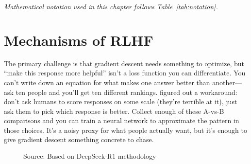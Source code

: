 \documentclass[12pt,a4paper]{report}
\theoremstyle{definition}
\newcommand{\source}[1]{\vspace{-0.5\baselineskip}\caption*{\small Source: #1}}
\begin{document}
\vspace{0.3cm}

\noindent\textit{Mathematical notation used in this chapter follows Table~\ref{tab:notation}.}

\section{Mechanisms of RLHF}
The primary challenge is that gradient descent needs something to optimize, but ``make this response more helpful'' isn't a loss function you can differentiate. You can't write down an equation for what makes one answer better than another---ask ten people and you'll get ten different rankings. \citet{christiano2017deep} figured out a workaround: don't ask humans to score responses on some scale (they're terrible at it), just ask them to pick which response is better. Collect enough of these A-vs-B comparisons and you can train a neural network to approximate the pattern in those choices. It's a noisy proxy for what people actually want, but it's enough to give gradient descent something concrete to chase.

\begin{figure}[htbp]
\centering
{}
\caption{Three-stage training for agentic systems. \textbf{Stage 1:} A base model supplies language understanding. \textbf{Stage 2:} Imitation learning on 5K--10K examples drills task formats. \textbf{Stage 3:} RL tunes the policy through environment interaction, letting agents cope with novel situations outside their training distribution.}
\label{fig:rl_pipeline}
\source{Based on DeepSeek-R1 methodology~\cite{deepseek2025r1}}
\end{figure}
\end{document}
